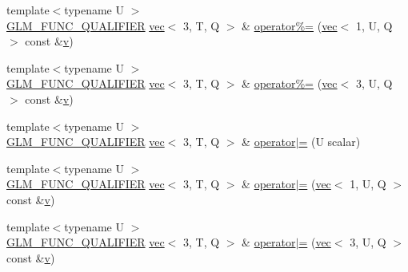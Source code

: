 \begin{DoxyCompactItemize}
\item 
{\footnotesize template$<$typename U $>$ }\\\mbox{\hyperlink{setup_8hpp_a33fdea6f91c5f834105f7415e2a64407}{G\+L\+M\+\_\+\+F\+U\+N\+C\+\_\+\+Q\+U\+A\+L\+I\+F\+I\+ER}} \mbox{\hyperlink{structglm_1_1vec}{vec}}$<$ 3, T, Q $>$ \& \mbox{\hyperlink{structglm_1_1vec_3_013_00_01_t_00_01_q_01_4_af436942fa5f5b2329bede870f539a223}{operator\%=}} (\mbox{\hyperlink{structglm_1_1vec}{vec}}$<$ 1, U, Q $>$ const \&\mbox{\hyperlink{_s_d_l__opengl_8h_a10a82eabcb59d2fcd74acee063775f90}{v}})
\item 
{\footnotesize template$<$typename U $>$ }\\\mbox{\hyperlink{setup_8hpp_a33fdea6f91c5f834105f7415e2a64407}{G\+L\+M\+\_\+\+F\+U\+N\+C\+\_\+\+Q\+U\+A\+L\+I\+F\+I\+ER}} \mbox{\hyperlink{structglm_1_1vec}{vec}}$<$ 3, T, Q $>$ \& \mbox{\hyperlink{structglm_1_1vec_3_013_00_01_t_00_01_q_01_4_ae6a625383036d5b89748613801ad94e6}{operator\%=}} (\mbox{\hyperlink{structglm_1_1vec}{vec}}$<$ 3, U, Q $>$ const \&\mbox{\hyperlink{_s_d_l__opengl_8h_a10a82eabcb59d2fcd74acee063775f90}{v}})
\item 
{\footnotesize template$<$typename U $>$ }\\\mbox{\hyperlink{setup_8hpp_a33fdea6f91c5f834105f7415e2a64407}{G\+L\+M\+\_\+\+F\+U\+N\+C\+\_\+\+Q\+U\+A\+L\+I\+F\+I\+ER}} \mbox{\hyperlink{structglm_1_1vec}{vec}}$<$ 3, T, Q $>$ \& \mbox{\hyperlink{structglm_1_1vec_3_013_00_01_t_00_01_q_01_4_a5c8e5e0dd0ca430f5e2a7d346d31f809}{operator$\vert$=}} (U scalar)
\item 
{\footnotesize template$<$typename U $>$ }\\\mbox{\hyperlink{setup_8hpp_a33fdea6f91c5f834105f7415e2a64407}{G\+L\+M\+\_\+\+F\+U\+N\+C\+\_\+\+Q\+U\+A\+L\+I\+F\+I\+ER}} \mbox{\hyperlink{structglm_1_1vec}{vec}}$<$ 3, T, Q $>$ \& \mbox{\hyperlink{structglm_1_1vec_3_013_00_01_t_00_01_q_01_4_a989756f0f4b1dfb7c3b6e07f30cbd790}{operator$\vert$=}} (\mbox{\hyperlink{structglm_1_1vec}{vec}}$<$ 1, U, Q $>$ const \&\mbox{\hyperlink{_s_d_l__opengl_8h_a10a82eabcb59d2fcd74acee063775f90}{v}})
\item 
{\footnotesize template$<$typename U $>$ }\\\mbox{\hyperlink{setup_8hpp_a33fdea6f91c5f834105f7415e2a64407}{G\+L\+M\+\_\+\+F\+U\+N\+C\+\_\+\+Q\+U\+A\+L\+I\+F\+I\+ER}} \mbox{\hyperlink{structglm_1_1vec}{vec}}$<$ 3, T, Q $>$ \& \mbox{\hyperlink{structglm_1_1vec_3_013_00_01_t_00_01_q_01_4_a7294cce332c6969861099356e29fbaa3}{operator$\vert$=}} (\mbox{\hyperlink{structglm_1_1vec}{vec}}$<$ 3, U, Q $>$ const \&\mbox{\hyperlink{_s_d_l__opengl_8h_a10a82eabcb59d2fcd74acee063775f90}{v}})

\end{DoxyCompactItemize}
